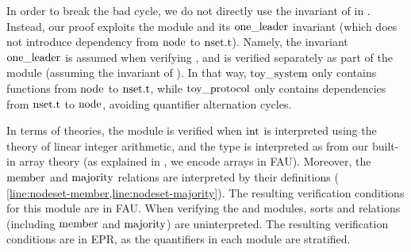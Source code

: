 \begin{sloppypar}
In order to break the bad cycle, we do not directly use the {\iintersect} invariant of {\mnodeset} in {\mtoysystem}. Instead, our proof exploits the {\mtoyprotocol} module and its ${\text{one\_leader}}$ invariant (which does not introduce dependency from ${\text{node}}$ to ${\text{nset.t}}$). Namely, the invariant ${\text{one\_leader}}$  is assumed when verifying {\mtoysystem}, and is verified separately as part of the {\mtoyprotocol} module (assuming the {\iintersect} invariant of {\mnodeset}).
In that way, ${\text{toy\_system}}$ only contains functions from ${\text{node}}$ to ${\text{nset.t}}$, while ${\text{toy\_protocol}}$ only contains dependencies from ${\text{nset.t}}$ to ${\text{node}}$, avoiding quantifier alternation cycles.
\end{sloppypar}

In terms of theories,
the {\mnodeset} module is verified when ${\text{int}}$ is interpreted using the theory of linear integer arithmetic,
and the {\tnodeset} type is interpreted as  from our built-in array theory (as explained in , we encode arrays in FAU).
Moreover, the ${\text{member}}$ and ${\text{majority}}$ relations are interpreted by their definitions ( \cref{line:nodeset-member,line:nodeset-majority}).
The resulting verification conditions for this module are in FAU.
%
%
When verifying the {\mtoyprotocol} and {\mtoysystem} modules, sorts and relations (including ${\text{member}}$ and ${\text{majority}}$) are uninterpreted.
The resulting verification conditions are in EPR, as the quantifiers in each module are stratified.

